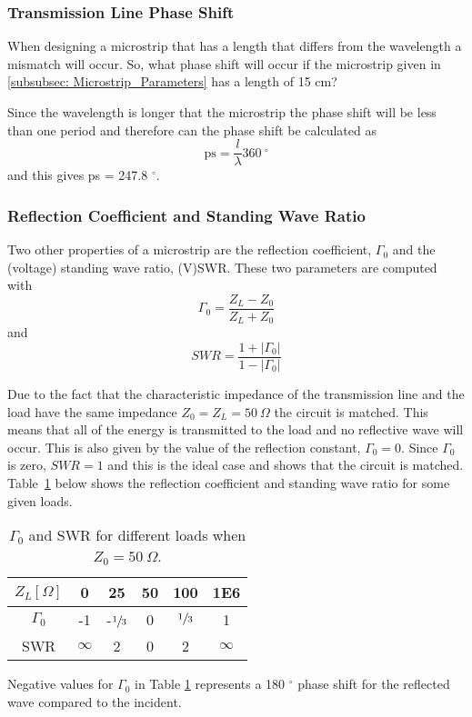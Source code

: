 \documentclass[report.tex]{subfiles}
\begin{document}
\subsubsection{Transmission Line Phase Shift}\label{subsubsec: Lab1 Phase Shift}
When designing a microstrip that has a length that differs from the wavelength a mismatch will occur. So, what phase shift will occur if the microstrip given in \ref{subsubsec: Microstrip_Parameters} has a length of 15 cm?

Since the wavelength is longer that the microstrip the phase shift will be less than one period and therefore can the phase shift be calculated as
\begin{equation}
	\text{ps} = \dfrac{l}{\lambda} 360 \:^\circ
\end{equation}
and this gives ps = 247.8 $^\circ$.
\subsubsection{Reflection Coefficient and Standing Wave Ratio}\label{subsec:Lab1 RC and SWR}
Two other properties of a microstrip are the reflection coefficient, $\Gamma_0$ and the (voltage) standing wave ratio, (V)SWR. These two parameters are computed with
\begin{equation}
	\Gamma_0 = \dfrac{Z_L - Z_0}{Z_L + Z_0}
\end{equation}
and
\begin{equation}
	SWR = \dfrac{1 + \left|\Gamma_0\right|}{1 - \left|\Gamma_0\right|}
\end{equation}

Due to the fact that the characteristic impedance of the transmission line and the load have the same impedance $Z_0 = Z_L = 50\:\Omega$ the circuit is matched. This means that all of the energy is transmitted to the load and no reflective wave will occur. This is also given by the value of the reflection constant, $\Gamma_0 = 0$. Since $\Gamma_0$ is zero, $SWR = 1$ and this is the ideal case and shows that the circuit is matched. Table~\ref{table: RC and SWR} below shows the reflection coefficient and standing wave ratio for some given loads.

\begin{table}[h]
    \centering
    \caption{$\Gamma_0$ and SWR for different loads when $Z_0= 50\: \Omega$.}
    \begin{tabular}{c | c c c c c}
         $Z_L [\Omega]$ & 0 & 25 & 50 & 100 & 1E6 \\
         \hline
         $\Gamma_0$ & -1 & -$\sfrac{1}{3}$ & 0 & $\sfrac{1}{3}$ & 1 \\
         SWR & $\infty$ & 2 & 0 & 2 & $\infty$
    \end{tabular}\label{table: RC and SWR}
\end{table}

Negative values for $\Gamma_0$ in Table \ref{table: RC and SWR} represents a 180 $^\circ$ phase shift for the reflected wave compared to the incident.
\end{document}
